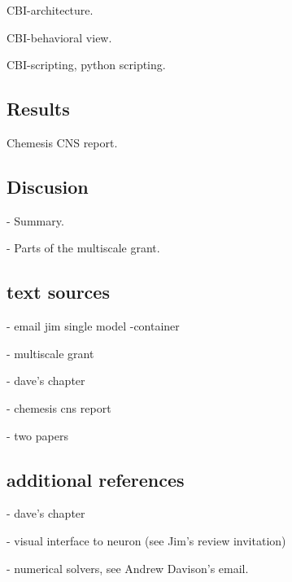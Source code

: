 \documentclass[12pt]{article}
\begin{document}
CBI-architecture.

CBI-behavioral view.

CBI-scripting, python scripting.


\subsection*{Results}

Chemesis CNS report.


\subsection*{Discusion}

- Summary.

- Parts of the multiscale grant.


\subsection*{text sources}

- email jim single model -container

- multiscale grant

- dave's chapter

- chemesis cns report

- two papers


\subsection*{additional references}

- dave's chapter

- visual interface to neuron (see Jim's review invitation)

- numerical solvers, see Andrew Davison's email.





\end{document}
